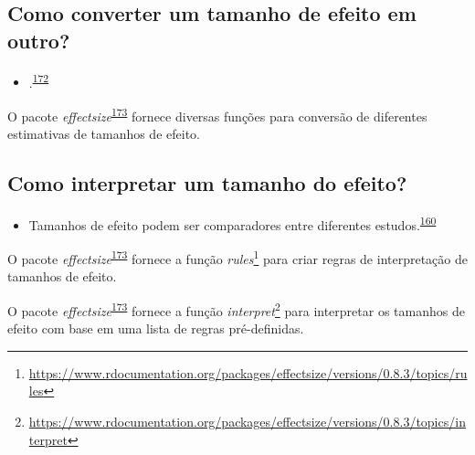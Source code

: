 \documentclass[
  a4paper,
]{book}
\providecommand{\tightlist}{%
  \setlength{\itemsep}{0pt}\setlength{\parskip}{0pt}}
\renewcommand{\href}[2]{#2\footnote{\url{#1}}}
\newenvironment{infobox}[1]
  {
  \begin{itemize}
  \renewcommand{\labelitemi}{
    \raisebox{-.7\height}[0pt][0pt]{
      {\setkeys{Gin}{width=3em,keepaspectratio}
        \texttt{[image: \#1]}}
    }
  }
  \setlength{\fboxsep}{1em}
  \begin{blackbox}
  \item
  }
  {
  \end{blackbox}
  \end{itemize}
  }
\begin{document}
\hypertarget{como-converter-um-tamanho-de-efeito-em-outro}{%
\subsection{Como converter um tamanho de efeito em outro?}\label{como-converter-um-tamanho-de-efeito-em-outro}}

\begin{itemize}
\tightlist
\item
  .\textsuperscript{\protect\hyperlink{ref-Kim2015}{172}}
\end{itemize}

\begin{infobox}{images/Rlogo}
O pacote \emph{effectsize}\textsuperscript{\protect\hyperlink{ref-effectsize}{173}} fornece diversas funções para conversão de diferentes estimativas de tamanhos de efeito.

\end{infobox}

\hypertarget{como-interpretar-um-tamanho-do-efeito}{%
\subsection{Como interpretar um tamanho do efeito?}\label{como-interpretar-um-tamanho-do-efeito}}

\begin{itemize}
\tightlist
\item
  Tamanhos de efeito podem ser comparadores entre diferentes estudos.\textsuperscript{\protect\hyperlink{ref-Sullivan2012}{160}}
\end{itemize}

\begin{infobox}{images/Rlogo}
O pacote \emph{effectsize}\textsuperscript{\protect\hyperlink{ref-effectsize}{173}} fornece a função \href{https://www.rdocumentation.org/packages/effectsize/versions/0.8.3/topics/rules}{\emph{rules}} para criar regras de interpretação de tamanhos de efeito.

\end{infobox}

\begin{infobox}{images/Rlogo}
O pacote \emph{effectsize}\textsuperscript{\protect\hyperlink{ref-effectsize}{173}} fornece a função \href{https://www.rdocumentation.org/packages/effectsize/versions/0.8.3/topics/interpret}{\emph{interpret}} para interpretar os tamanhos de efeito com base em uma lista de regras pré-definidas.

\end{infobox}
\end{document}
